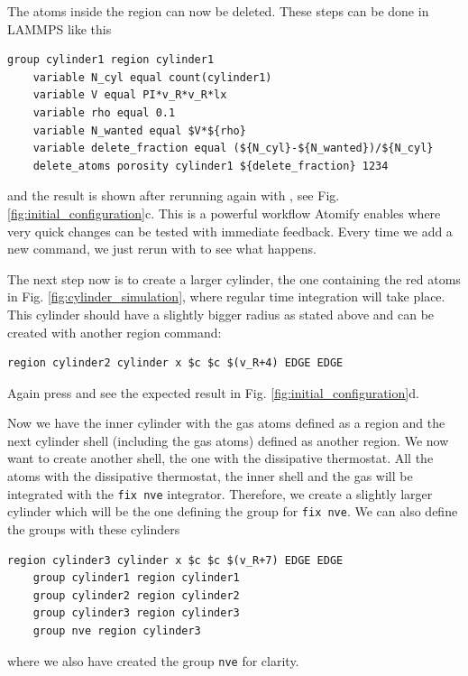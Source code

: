 \documentclass[aps,pre,twocolumn,letterpaper,floatfix,nofootinbib]{revtex4}
\newcommand{\code}[1]{\colorbox{light-gray}{\color{RawSienna}\texttt{#1}}}
\begin{document}
The atoms inside the region can now be deleted. These steps can be done in LAMMPS like this
\begin{lstlisting}[basicstyle=\tiny, frame = none, numbers=none, framexleftmargin=0pt, xleftmargin=-0.75cm, xrightmargin=0.0cm]
	group cylinder1 region cylinder1
	variable N_cyl equal count(cylinder1)
	variable V equal PI*v_R*v_R*lx
	variable rho equal 0.1
	variable N_wanted equal $V*${rho}
	variable delete_fraction equal (${N_cyl}-${N_wanted})/${N_cyl}
	delete_atoms porosity cylinder1 ${delete_fraction} 1234
\end{lstlisting}
and the result is shown after rerunning again with , see Fig. \ref{fig:initial_configuration}c.
This is a powerful workflow Atomify enables where very quick changes can be tested with immediate feedback.
Every time we add a new command, we just rerun with  to see what happens.

The next step now is to create a larger cylinder, the one containing the red atoms in Fig. \ref{fig:cylinder_simulation}, where regular time integration will take place.
This cylinder should have a slightly bigger radius as stated above and can be created with another region command:
\begin{lstlisting}[basicstyle=\tiny, frame = none, numbers=none, framexleftmargin=0pt, xleftmargin=-0.75cm, xrightmargin=0.0cm]
	region cylinder2 cylinder x $c $c $(v_R+4) EDGE EDGE
\end{lstlisting}
Again press  and see the expected result in Fig. \ref{fig:initial_configuration}d.

Now we have the inner cylinder with the gas atoms defined as a region and the next cylinder shell (including the gas atoms) defined as another region.
We now want to create another shell, the one with the dissipative thermostat.
All the atoms with the dissipative thermostat, the inner shell and the gas will be integrated with the \code{fix nve} integrator.
Therefore, we create a slightly larger cylinder which will be the one defining the group for \code{fix nve}.
We can also define the groups with these cylinders
\begin{lstlisting}[basicstyle=\tiny, frame = none, numbers=none, framexleftmargin=0pt, xleftmargin=-0.75cm, xrightmargin=0.0cm]
	region cylinder3 cylinder x $c $c $(v_R+7) EDGE EDGE
	group cylinder1 region cylinder1
	group cylinder2 region cylinder2
	group cylinder3 region cylinder3
	group nve region cylinder3
\end{lstlisting}
where we also have created the group \code{nve} for clarity.
\end{document}
